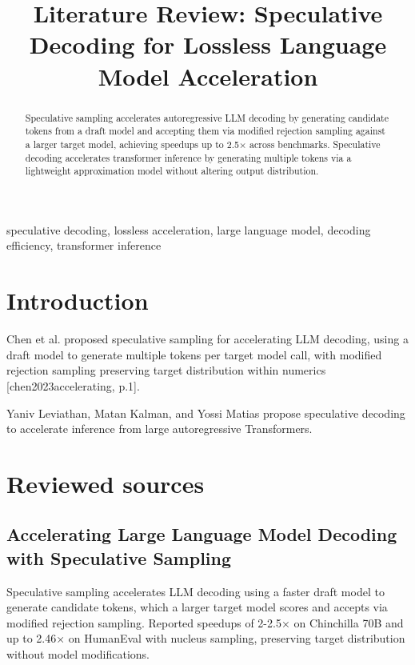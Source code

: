 \documentclass[conference]{IEEEtran}
\begin{document}
\title{Literature Review: Speculative Decoding for Lossless Language Model Acceleration}
\author{}
\maketitle
\begin{abstract}
Speculative sampling accelerates autoregressive LLM decoding by generating candidate tokens from a draft model and accepting them via modified rejection sampling against a larger target model, achieving speedups up to 2.5× across benchmarks. \cite{chen2023accelerating} Speculative decoding accelerates transformer inference by generating multiple tokens via a lightweight approximation model without altering output distribution. \cite{leviathan2022fast}
\end{abstract}
\begin{IEEEkeywords}speculative decoding, lossless acceleration, large language model, decoding efficiency, transformer inference\end{IEEEkeywords}
\section{Introduction}
Chen et al. proposed speculative sampling for accelerating LLM decoding, using a draft model to generate multiple tokens per target model call, with modified rejection sampling preserving target distribution within numerics [chen2023accelerating, p.1]. \cite{chen2023accelerating}

Yaniv Leviathan, Matan Kalman, and Yossi Matias propose speculative decoding to accelerate inference from large autoregressive Transformers. \cite{leviathan2022fast}

\section{Reviewed sources}
\subsection{Accelerating Large Language Model Decoding with Speculative Sampling}
Speculative sampling accelerates LLM decoding using a faster draft model to generate candidate tokens, which a larger target model scores and accepts via modified rejection sampling. Reported speedups of 2-2.5× on Chinchilla 70B and up to 2.46× on HumanEval with nucleus sampling, preserving target distribution without model modifications. \cite{chen2023accelerating}
\end{document}
